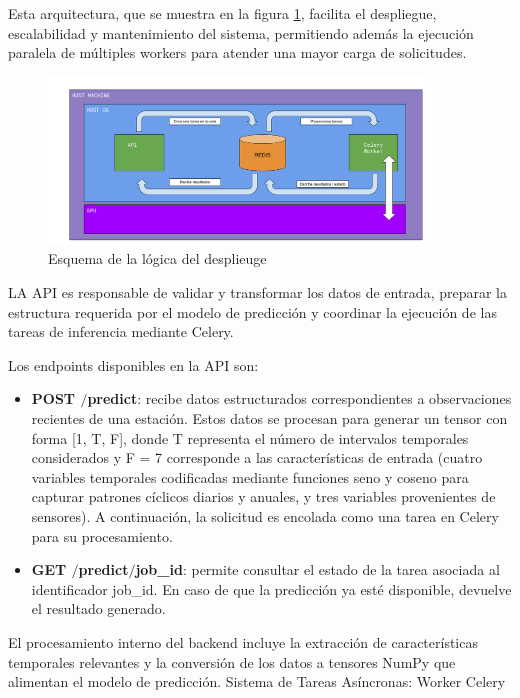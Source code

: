 Esta arquitectura, que se muestra en la figura \ref{deploy_scheme}, facilita el despliegue, escalabilidad y mantenimiento del sistema, permitiendo además la ejecución paralela de múltiples workers para atender una mayor carga de solicitudes.
\begin{figure}[H]
    \centering
    \includegraphics[width=0.9\textwidth]{images/esquema_despliegue.png}
    \caption{Esquema de la lógica del desplieuge}
    \label{deploy_scheme}
\end{figure}

LA API es responsable de validar y transformar los datos de entrada, preparar la estructura requerida por el modelo de predicción y coordinar la ejecución de las tareas de inferencia mediante Celery.

Los endpoints disponibles en la API son:

\begin{itemize}
    \item \textbf{POST $/$predict}:  recibe datos estructurados correspondientes a observaciones recientes de una estación. Estos datos se procesan para generar un tensor con forma [1, T, F], donde T representa el número de intervalos temporales considerados y F = 7 corresponde a las características de entrada (cuatro variables temporales codificadas mediante funciones seno y coseno para capturar patrones cíclicos diarios y anuales, y tres variables provenientes de sensores). A continuación, la solicitud es encolada como una tarea en Celery para su procesamiento.
    \item \textbf{GET $/$predict$/${job\_id}}: permite consultar el estado de la tarea asociada al identificador job\_id. En caso de que la predicción ya esté disponible, devuelve el resultado generado.
\end{itemize}
El procesamiento interno del backend incluye la extracción de características temporales relevantes y la conversión de los datos a tensores NumPy que alimentan el modelo de predicción.
Sistema de Tareas Asíncronas: Worker Celery


